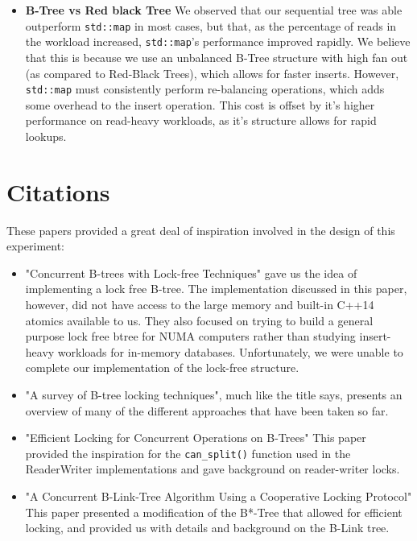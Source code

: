 \documentclass{sig-alternate}
\begin{document}
\begin{itemize}
\item \textbf{B-Tree vs Red black Tree} We observed that our sequential tree was able outperform \texttt{std::map} in most cases, but that, as the percentage of reads in the workload increased, \texttt{std::map}'s performance improved rapidly.  We believe that this is because we use an unbalanced B-Tree structure with high fan out (as compared to Red-Black Trees), which allows for faster inserts.  However, \texttt{std::map} must consistently perform re-balancing operations, which adds some overhead to the insert operation. This cost is offset by it's higher performance on read-heavy workloads, as it's structure allows for rapid lookups.

\end{itemize}

\section{Citations}
These papers provided a great deal of inspiration involved in the design of this experiment:
\begin{itemize}
  \item "Concurrent B-trees with Lock-free Techniques"\cite{sultana:lockfree} gave us the idea of implementing a lock free B-tree.  The implementation discussed in this paper, however, did not have access to the large memory and built-in C++14 atomics available to us. They also focused on trying to build a general purpose lock free btree for NUMA computers rather than studying insert-heavy workloads for in-memory databases. Unfortunately, we were unable to complete our implementation of the lock-free structure.
  \item "A survey of B-tree locking techniques"\cite{graefe:survey}, much like the title says, presents an overview of many of the different approaches that have been taken so far.
  \item "Efficient Locking for Concurrent Operations on B-Trees" \cite{lehman:locking} This paper provided the inspiration for the \texttt{can\_split()} function used in the ReaderWriter implementations and gave background on reader-writer locks.
\item "A Concurrent B-Link-Tree Algorithm Using a Cooperative Locking Protocol" \cite{lim:blink} This paper presented a modification of the B*-Tree that allowed for efficient locking, and provided us with details and background on the B-Link tree.
\end{itemize}



\end{document}
